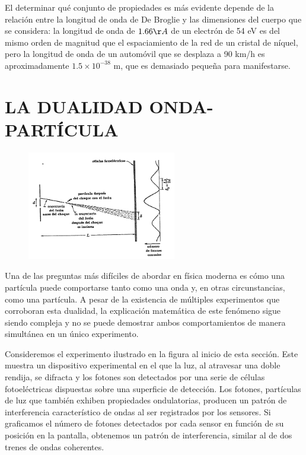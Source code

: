 \documentclass[a4paper]{article}
\begin{document}
    \newpage
    \noindent
    \thispagestyle{fancy}

El determinar qué conjunto de propiedades es más evidente depende de la relación entre la longitud de onda de De Broglie y las dimensiones del cuerpo que se considera: la longitud de onda de {$1.66 \AA$} de un electrón de 54 eV es del mismo orden de magnitud que el espaciamiento de la red de un cristal de níquel, pero la longitud de onda de un automóvil que se desplaza a 90 km/h es aproximadamente $1.5 \times 10^{-38}$ m, que es demasiado pequeña para manifestarse.

\section{LA DUALIDAD ONDA-PARTÍCULA}

    \begin{figure}[h!]
        \centering
        \includegraphics[width = 6.5cm]{../imagenes/expDualidadOP.png}
    \end{figure}

    \indent Una de las preguntas más difíciles de abordar en física moderna es cómo una partícula puede comportarse tanto como una onda y, en otras circunstancias, como una partícula. A pesar de la existencia de múltiples experimentos que corroboran esta dualidad, la explicación matemática de este fenómeno sigue siendo compleja y no se puede demostrar ambos comportamientos de manera simultánea en un único experimento.

    \indent Consideremos el experimento ilustrado en la figura al inicio de esta sección. Este muestra un dispositivo experimental en el que la luz, al atravesar una doble rendija, se difracta y los fotones son detectados por una serie de células fotoeléctricas dispuestas sobre una superficie de detección. Los fotones, partículas de luz que también exhiben propiedades ondulatorias, producen un patrón de interferencia característico de ondas al ser registrados por los sensores. Si graficamos el número de fotones detectados por cada sensor en función de su posición en la pantalla, obtenemos un patrón de interferencia, similar al de dos trenes de ondas coherentes.\\
\end{document}

